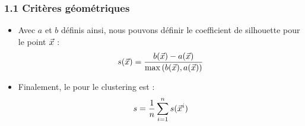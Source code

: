\begin{frame}
\frametitle{1.1 Critères géométriques}
\begin{itemize}
  \item Avec $a$ et $b$ définis ainsi, nous pouvons définir le coefficient de silhouette pour le point $\vec{x}$ : 
  \begin{equation*}
  s(\vec{x}) = \frac{b(\vec{x})-a(\vec{x}) }{\max{(b(\vec{x}), a(\vec{x}))}  }
  \end{equation*}
  \item Finalement, le  pour le clustering est :
  \begin{equation*}
  s = \frac1n \sum_{i=1}^{n}s(\vec{x}^i)
  \end{equation*}

\end{itemize}
\end{frame}



